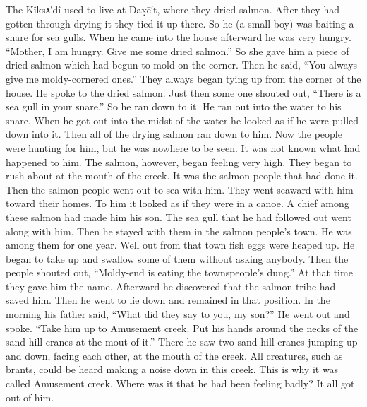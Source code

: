 The Kîksᴀ′dî used to live at Dax̣ē′t, where they dried salmon.
After they had gotten through drying it they tied it up there.
So he (a small boy) was baiting a snare for sea gulls.
When he came into the house afterward he was very hungry.
\qqk{}“Mother, I am hungry.
Give me some dried salmon.” So she gave him a piece of dried salmon which had begun to mold on the corner.
Then he said, \qqk{}“You always give me moldy-cornered ones.” They always began tying up from the corner of the house.
He spoke to the dried salmon.
Just then some one shouted out, \qqk{}“There is a sea gull in your snare.” So he ran down to it.
He ran out into the water to his snare.
When he got out into the midst of the water he looked as if he were pulled down into it.
Then all of the drying salmon ran down to him.
Now the people were hunting for him, but he was nowhere to be seen.
It was not known what had happened to him.
The salmon, however, began feeling very high.
They began to rush about at the mouth of the creek.
It was the salmon people that had done it.
Then the salmon people went out to sea with him.
They went seaward with him toward their homes.
To him it looked as if they were in a canoe.
A chief among these salmon had made him his son.
The sea gull that he had followed out went along with him.
Then he stayed with them in the salmon people’s town.
He was among them for one year.
Well out from that town fish eggs were heaped up.
He began to take up and swallow some of them without asking anybody.
Then the people shouted out, “Moldy-end is eating the townspeople’s dung.” At that time they gave him the name.
Afterward he discovered that the salmon tribe had saved him.
Then he went to lie down and remained in that position.
In the morning his father said, “What did they say to you, my son?” He went out and spoke. “Take him up to Amusement creek.
Put his hands around the necks of the sand-hill cranes at the mout of it.” There he saw two sand-hill cranes jumping up and down, facing each other, at the mouth of the creek.
All creatures, such as brants, could be heard making a noise down in this creek.
This is why it was called Amusement creek.
Where was it that he had been feeling badly?
It all got out of him.

